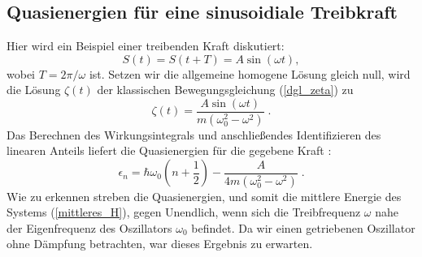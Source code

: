       \subsection{Quasienergien für eine sinusoidiale Treibkraft}
      \label{epsilon_sinuskraft}
        Hier wird ein Beispiel einer treibenden Kraft diskutiert: %
        \begin{equation}
          S(t) = S(t+T) = A\sin(\omega t),
        \end{equation}
        wobei $T=2\pi / \omega$ ist.
        Setzen wir die allgemeine homogene Lösung gleich null, wird die Lösung $\zeta(t)$ der klassischen Bewegungsgleichung (\ref{dgl_zeta}) zu \cite{mads}
        \begin{equation}
          \zeta(t) = \frac{A\sin(\omega t)}{m(\omega_0^2 - \omega^2)} \;
          \label{zeta_sinuskraft}.
        \end{equation}
        Das Berechnen des Wirkungsintegrals und anschließendes Identifizieren des linearen Anteils liefert die Quasienergien für die gegebene Kraft \cite{mads}:
        \begin{equation}
          \epsilon_n  = \hbar \omega_0\left(n+\frac{1}{2}\right) - \frac{A}{4m(\omega_0^2-\omega^2)} \;.
        \end{equation}
        Wie zu erkennen streben die Quasienergien, und somit die mittlere Energie des Systems (\ref{mittleres_H}), gegen Unendlich, wenn sich die Treibfrequenz $\omega$ nahe der Eigenfrequenz des Oszillators $\omega_0 $ befindet.
        Da wir einen getriebenen Oszillator ohne Dämpfung betrachten, war dieses Ergebnis zu erwarten.



